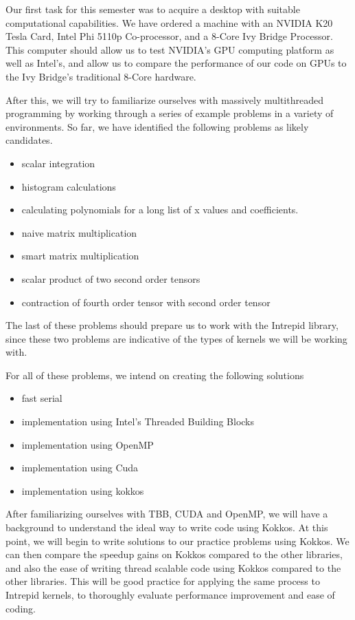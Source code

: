 \documentclass[proposal]{hmcclinic}
\begin{document}
Our first task for this semester was to acquire a desktop with suitable
computational capabilities. We have ordered a machine with an NVIDIA K20 Tesla Card,
Intel Phi 5110p Co-processor, and a 8-Core Ivy Bridge Processor. This computer
 should allow us to test NVIDIA's GPU computing platform as well as Intel's, and
allow us to compare the performance of our code on GPUs to the Ivy Bridge's traditional
8-Core hardware. 

After this, we will try to familiarize ourselves with massively multithreaded
programming by working through a series of example problems in a variety of
environments. So far, we have identified the following problems as likely candidates.
\begin{itemize}
	\item scalar integration
	\item histogram calculations
	\item calculating polynomials for a long list of x values and coefficients.
	\item naive matrix multiplication
	\item smart matrix multiplication
	\item scalar product of two second order tensors 
	\item contraction of fourth order tensor with second order tensor
\end{itemize}
The last of these problems should prepare us to work with the Intrepid library, since these
two problems are indicative of the types of kernels we will be working with. 

For all of these problems, we intend on creating the following solutions
\begin{itemize}
	\item fast serial
	\item implementation using Intel's Threaded Building Blocks
	\item implementation using OpenMP
	\item implementation using Cuda
	\item implementation using kokkos
\end{itemize}
After familiarizing ourselves with TBB, CUDA and OpenMP, we will have a
background to understand the ideal way to write code using Kokkos. At this
point, we will begin to write solutions to our practice problems using Kokkos.
We can then compare the speedup gains on Kokkos compared to the other
libraries, and also the ease of writing thread scalable code using Kokkos
compared to the other libraries. This will be good practice for applying the same 
process to Intrepid kernels, to thoroughly evaluate performance improvement and ease of coding.
\end{document}

